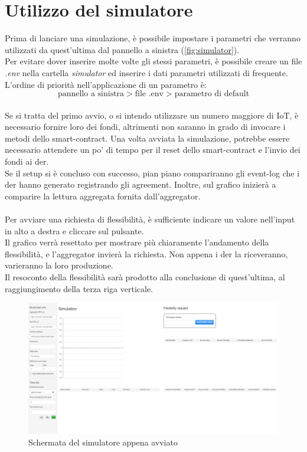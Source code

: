 \section{Utilizzo del simulatore}

Prima di lanciare una simulazione, è possibile impostare i parametri che verranno utilizzati da quest'ultima dal pannello a sinistra (\autoref{fig:simulator}). \\
Per evitare dover inserire molte volte gli stessi parametri,
è possibile creare un file \textit{.env} nella cartella \textit{simulator} ed inserire i dati parametri utilizzati di frequente. \\
L'ordine di priorità nell'applicazione di un parametro è:
$$
    \text{pannello a sinistra} > \text{file .env} > \text{parametro di default}
$$
\\
Se si tratta del primo avvio, o si intendo utilizzare un numero maggiore di IoT, è necessario fornire loro dei fondi,
altrimenti non saranno in grado di invocare i metodi dello \gls{smart-contract}.
Una volta avviata la simulazione, potrebbe essere necessario attendere un po' di tempo per il reset dello \gls{smart-contract} e l'invio dei fondi ai \gls{der}. \\
Se il setup si è concluso con successo, pian piano compariranno gli \gls{event-log} che i \gls{der} hanno generato registrando gli \gls{agreement}.
Inoltre, sul grafico inizierà a comparire la lettura aggregata fornita dall'\gls{aggregator}. \\
\\
Per avviare una richiesta di flessibilità, è sufficiente indicare un valore nell'input in alto a destra e cliccare sul pulsante. \\
Il grafico verrà resettato per mostrare più chiaramente l'andamento della flessibilità, e l'\gls{aggregator} invierà la richiesta.
Non appena i \gls{der} la riceveranno, varieranno la loro produzione. \\
Il resoconto della flessibilità sarà prodotto alla conclusione di quest'ultima, al raggiungimento della terza riga verticale.

\begin{figure}[h]
    \includegraphics[width=\textwidth]{img/Simulator.jpg}
    \caption{Schermata del simulatore appena avviato \label{fig:simulator}}
\end{figure}

